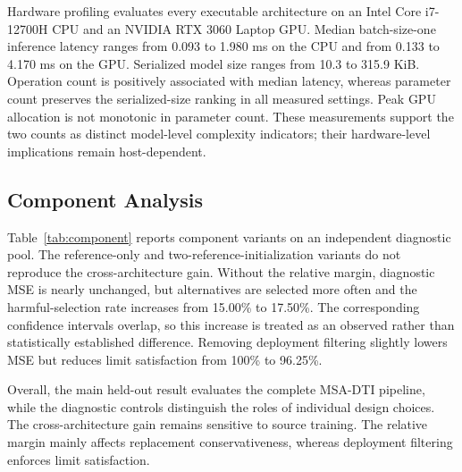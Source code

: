 \documentclass[a4paper,fleqn]{cas-sc}
\begin{document}
Hardware profiling evaluates every executable architecture on an Intel Core
i7-12700H CPU and an NVIDIA RTX 3060 Laptop GPU. Median batch-size-one
inference latency ranges from 0.093 to 1.980 ms on the CPU and from 0.133 to
4.170 ms on the GPU. Serialized model size ranges from 10.3 to 315.9 KiB.
Operation count is positively associated with median latency, whereas
parameter count preserves the serialized-size ranking in all measured
settings. Peak GPU allocation is not monotonic in parameter count. These
measurements support the two counts as distinct model-level complexity
indicators; their hardware-level implications remain host-dependent.

\subsection{Component Analysis}
\label{subsec:component}

Table~\ref{tab:component} reports component variants on an independent
diagnostic pool. The reference-only and two-reference-initialization variants
do not reproduce the cross-architecture gain. Without the relative margin,
diagnostic MSE is nearly unchanged, but alternatives are selected more often
and the harmful-selection rate increases from 15.00\% to 17.50\%. The
corresponding confidence intervals overlap, so this increase is treated as an
observed rather than statistically established difference. Removing deployment
filtering slightly lowers MSE but reduces limit satisfaction from 100\% to
96.25\%.

Overall, the main held-out result evaluates the complete MSA-DTI pipeline,
while the diagnostic controls distinguish the roles of individual design
choices. The cross-architecture gain remains sensitive to source training. The
relative margin mainly affects replacement conservativeness, whereas
deployment filtering enforces limit satisfaction.
\end{document}
